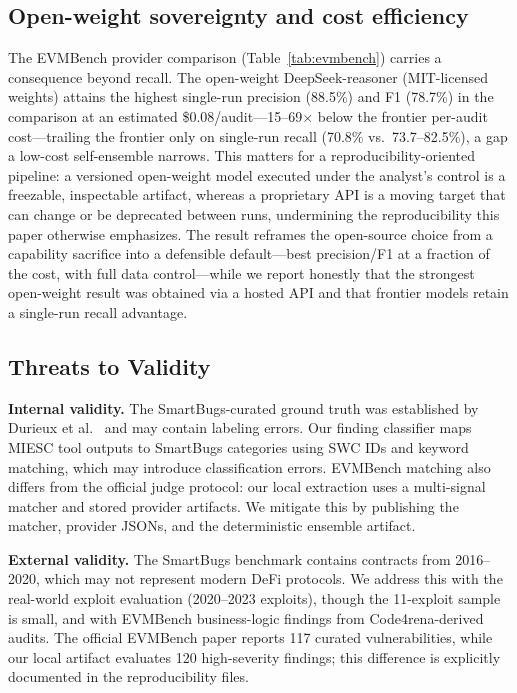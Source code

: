 \documentclass[conference]{IEEEtran}
\begin{document}
\subsection{Open-weight sovereignty and cost efficiency}

The EVMBench provider comparison (Table~\ref{tab:evmbench}) carries a consequence beyond recall. The open-weight DeepSeek-reasoner (MIT-licensed weights) attains the highest single-run precision (88.5\%) and F1 (78.7\%) in the comparison at an estimated \$0.08/audit---15--69$\times$ below the frontier per-audit cost---trailing the frontier only on single-run recall (70.8\% vs.\ 73.7--82.5\%), a gap a low-cost self-ensemble narrows. This matters for a reproducibility-oriented pipeline: a versioned open-weight model executed under the analyst's control is a freezable, inspectable artifact, whereas a proprietary API is a moving target that can change or be deprecated between runs, undermining the reproducibility this paper otherwise emphasizes. The result reframes the open-source choice from a capability sacrifice into a defensible default---best precision/F1 at a fraction of the cost, with full data control---while we report honestly that the strongest open-weight result was obtained via a hosted API and that frontier models retain a single-run recall advantage.

\subsection{Threats to Validity}

\textbf{Internal validity.} The SmartBugs-curated ground truth was established by Durieux et al.~\cite{durieux2020empirical} and may contain labeling errors. Our finding classifier maps MIESC tool outputs to SmartBugs categories using SWC IDs and keyword matching, which may introduce classification errors. EVMBench matching also differs from the official judge protocol: our local extraction uses a multi-signal matcher and stored provider artifacts. We mitigate this by publishing the matcher, provider JSONs, and the deterministic ensemble artifact.

\textbf{External validity.} The SmartBugs benchmark contains contracts from 2016--2020, which may not represent modern DeFi protocols. We address this with the real-world exploit evaluation (2020--2023 exploits), though the 11-exploit sample is small, and with EVMBench business-logic findings from Code4rena-derived audits. The official EVMBench paper reports 117 curated vulnerabilities, while our local artifact evaluates 120 high-severity findings; this difference is explicitly documented in the reproducibility files.
\end{document}

